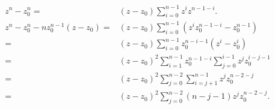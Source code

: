 \begin{proofenv}
    \begin{align*}
        z^n-z_0^n=&(z-z_0)\sum_{i=0}^{n-1}z^iz^{n-1-i}.\\
        z^n-z_0^n-nz_0^{n-1}(z-z_0)=&(z-z_0)\sum_{i=0}^{n-1}(z^i z_0^{n-1-i}-z_0^{n-1})\\
        =&(z-z_0)\sum_{i=0}^{n-1}z_0^{n-i-1} (z^i-z_0^i)\\
        =& (z-z_0)^2\sum_{i=1}^{n-1}z_0^{n-1-i}\sum_{j=0}^{i-1}z^jz_0^{i-j-1}\\
        =&(z-z_0)^2\sum_{j=0}^{n-2}\sum_{i=j+1}^{n-1}z^j z_0^{n-2-j}\\
        =&(z-z_0)^2 \sum_{j=0}^{n-2}(n-j-1)z^j z_0^{n-2-j}.
    \end{align*}
\end{proofenv}

